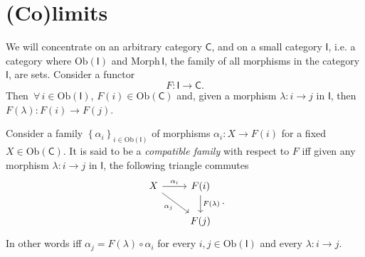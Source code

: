 \section{(Co)limits}
We will concentrate on an arbitrary category $\mathsf{C}$,
and on a small category $\mathsf{I}$,
i.e. a category where $\mathrm{Ob} \left(\mathsf{I}\right)$ and $\mathrm{Morph}\, \mathsf{I}$,
the family of all morphisms in the category $\mathsf{I}$, are sets.
Consider a functor 
\begin{equation}
F\colon \mathsf{I} \to \mathsf{C}
.\end{equation} 
Then $\,\forall\, i \in \mathrm{Ob} \left(\mathsf{I}\right)$, $F(i) \in \mathrm{Ob} \left(\mathsf{C}\right)$ and,
given a morphism $\lambda\colon i \to j$ in $\mathsf{I}$, then $F(\lambda)\colon F(i) \to F(j)$.

\begin{defn}
	Consider a family $\left\{ \alpha_i \right\}_{i \in \mathrm{Ob} \left(\mathsf{I}\right)}$ of morphisms 
	$\alpha_i\colon X \to F(i)$ for a fixed $X \in \mathrm{Ob} \left(\mathsf{C}\right)$.
	It is said to be a {\em compatible family} with respect to $F$ iff
	given any morphism $\lambda\colon i \to j$ in $\mathsf{I}$, the following triangle commutes
	\begin{equation}
	\begin{tikzcd}
		X \arrow[r, "\alpha_i", rightarrow] \arrow[rd, "\alpha_j"', rightarrow] &
		F(i) \arrow[d, "F(\lambda)", rightarrow] \\
		&
		F(j)
	\end{tikzcd}
	.\end{equation} 
	In other words iff $\alpha_j = F(\lambda) \circ \alpha_i$ for every $i, j \in \mathrm{Ob} \left(\mathsf{I}\right)$ and every $\lambda\colon i \to j$.
\end{defn}

